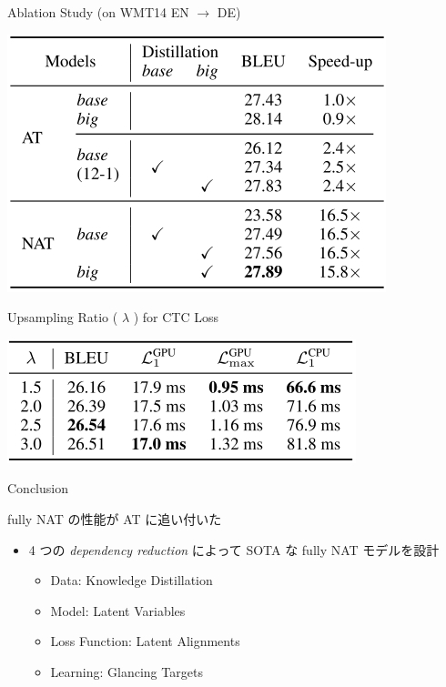 \documentclass[unicode, 12pt, xdvipdfmx, aspectratio=43]{beamer}
\begin{document}
\begin{frame}[label={sec:org048f385}]{Ablation Study (on WMT14 EN \(\rightarrow\) DE)}
\begin{center}
\includegraphics[width=0.7\linewidth]{./figure/Table5.pdf}
\end{center}
\end{frame}

\begin{frame}[label={sec:org84ef173}]{Upsampling Ratio ( \(\lambda\) ) for CTC Loss}
\begin{center}
\includegraphics[width=0.7\linewidth]{./figure/Table6.pdf}
\end{center}
\end{frame}

\begin{frame}[label={sec:org320b040}]{Conclusion}
\begin{block}{fully NAT の性能が AT に追い付いた}
\begin{itemize}
\item 4 つの \textit{dependency reduction} によって SOTA な fully NAT モデルを設計
\begin{itemize}
\item Data: Knowledge Distillation
\item Model: Latent Variables
\item Loss Function: Latent Alignments
\item Learning: Glancing Targets
\end{itemize}
\end{itemize}
\end{block}
\end{frame}
\end{document}

